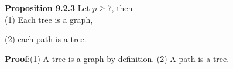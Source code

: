 \documentclass{article}
\begin{document}
{\bf Proposition 9.2.3} \quad Let $p\geq 7$, then\\
(1) Each tree is a graph,

(2) each path is a tree.


{\bf Proof}:\quad (1) A tree is a graph by definition. (2) A path is a tree.
\end{document}
